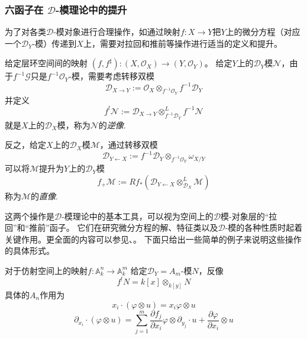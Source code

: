\subsubsection{六函子在 $\mathcal{D}$-模理论中的提升}

为了对各类$\mathcal{D}$-模对象进行合理操作，如通过映射$f:X\to Y$把$Y$上的微分方程（对应一个$\mathcal{D}_Y$-模）传递到$X$上，需要对拉回和推前等操作进行适当的定义和提升。

给定层环空间间的映射 $\left(f,f^\sharp \right):\left(X,\mathcal{O}_X\right) \to \left(Y,\mathcal{O}_Y\right)$。
给定$Y$上的$\mathcal{D}_Y$模$\mathcal{N}$，由于$f^{-1}\mathcal{G}$只是$f^{-1}\mathcal{O}_Y$-模，需要考虑转移双模
\begin{equation*}
    \mathcal{D}_{X\to Y}
    :=
    \mathcal{O}_X\otimes_{f^{-1}\mathcal{O}_Y} f^{-1}\mathcal{D}_Y
\end{equation*}
并定义
\begin{equation*}
    f^!\mathcal{N}
    :=
    \mathcal{D}_{X\to Y}\otimes_{f^{-1}\mathcal{D}_Y}^L f^{-1}\mathcal{N}
\end{equation*}
就是$X$上的$\mathcal{D}_X$模，称为$\mathcal{N}$的\emph{逆像}.

反之，给定$X$上的$\mathcal{D}_X$模$\mathcal{M}$，通过转移双模
\begin{equation*}
    \mathcal{D}_{Y\leftarrow X}
    :=
    f^{-1}\mathcal{D}_Y\otimes_{f^{-1}\mathcal{O}_Y}\omega_{X/Y}
\end{equation*}
可以将$\mathcal{M}$提升为$Y$上的$\mathcal{D}_Y$模
\begin{equation*}
    f_+\mathcal{M}
    :=
    Rf_*(\mathcal{D}_{Y\leftarrow X}\otimes^L_{\mathcal{D}_X}\mathcal{M})
\end{equation*}
称为$\mathcal{M}$的\emph{直像}.

这两个操作是$\mathcal{D}$-模理论中的基本工具，可以视为空间上的$\mathcal{D}$模-对象层的“拉回”和“推前”函子。 它们在研究微分方程的解、特征类以及$\mathcal{D}$-模的各种性质时起着关键作用。更全面的内容可以参见\cite{gallauer2021introduction}、\cite{kashiwara2013sheaves}。
下面只给出一些简单的例子来说明这些操作的具体形式。

\begin{example}
    对于仿射空间上的映射$f:\mathbb{A}_k^n \to \mathbb{A}_k^m$ 给定$\mathcal{D}_Y=A_m$-模$N$，反像
    \begin{equation*}
        f^!N= k[x]\otimes_{k[y]}N
    \end{equation*}
    具体的$A_n$作用为
    \begin{equation*}
        x_i\cdot (\varphi\otimes u)
        =
        x_i\varphi\otimes u
    \end{equation*}
    \begin{equation*}
        \partial_{x_i}\cdot (\varphi\otimes u)
        =
        \sum_{j=1}^m \frac{\partial f_j}{\partial x_i} \varphi\otimes \partial_{y_j}\cdot u
        +
        \frac{\partial \varphi}{\partial x_i}\otimes u
    \end{equation*}

\end{example}


